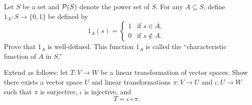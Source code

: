 \documentclass[../main.tex]{subfiles}
\begin{document}
\begin{homework}
    Let $S$ be a set and $\mathcal{P}(S)$ denote the power set of $S$. For any $A \subseteq S$, define $1_A\colon S \to \{0, 1\}$ be defined by
    \[1_A(s) = \begin{cases} 1 & \text{if }s \in A, \\ 0 & \text{if }s \notin A.\end{cases}\]
    Prove that $1_A$ is well-defined. This function $1_A$ is called the ``characteristic function of $A$ in $S$.''
\end{homework}
\begin{homework}
    Extend  as follows: let $T\colon V\to W$ be a linear transformation of vector spaces. Show there exists a vector space $U$ and linear transformations $\pi\colon V\to U$ and $\iota\colon U\to W$ such that $\pi$ is surjective, $\iota$ is injective, and
    \[T=\iota\circ\pi.\]
\end{homework}
\end{document}
